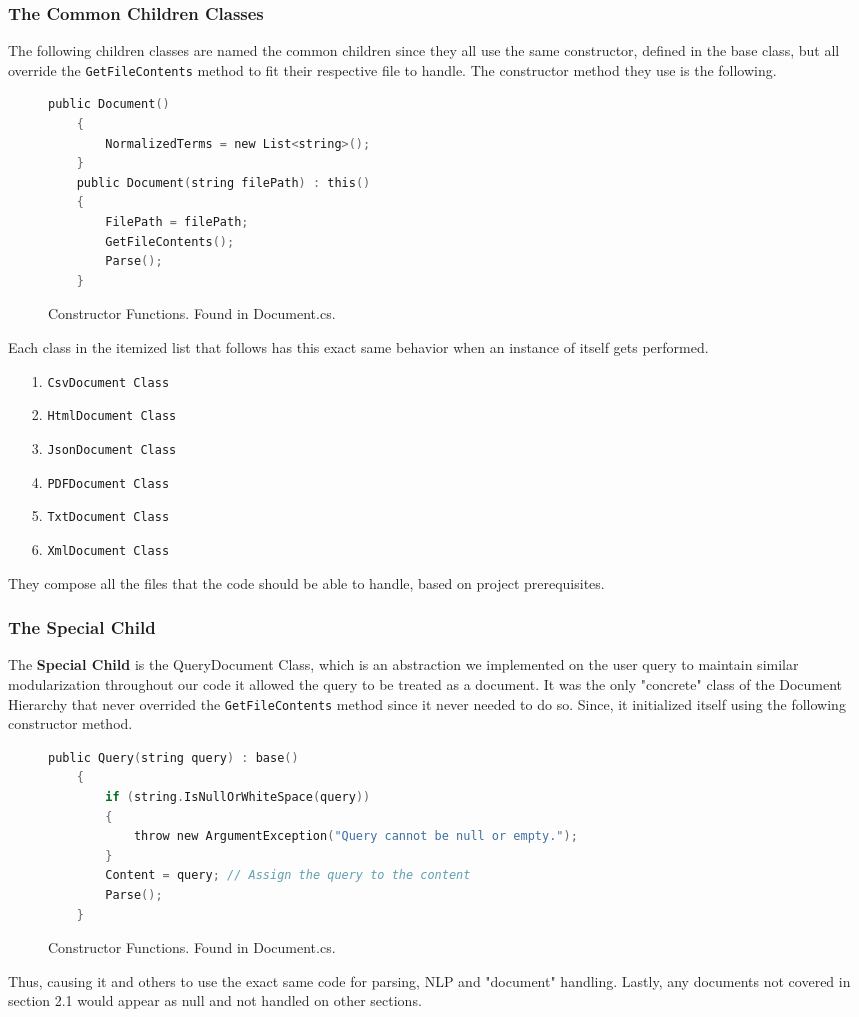 \documentclass{article}
\begin{document}
\subsubsection{The Common Children Classes}
The following children classes are named the common children since they all use the same constructor, defined in the base class, but all override the \texttt{GetFileContents} method to fit their respective file to handle. The constructor method they use is the following.
\begin{figure}[H]
    \begin{lstlisting}[language=C]
    public Document() 
    {
        NormalizedTerms = new List<string>();
    }
    public Document(string filePath) : this()
    {   
        FilePath = filePath;
        GetFileContents();
        Parse();
    }
    \end{lstlisting}
    \caption{Constructor Functions. Found in Document.cs.}
    \label{fig:Constructor}
\end{figure}
Each class in the itemized list that follows has this exact same behavior when an instance of itself gets performed. 
\begin{itemize}
    \item[1.] \texttt{CsvDocument Class} 
    \item[2.] \texttt{HtmlDocument Class}
    \item[3.] \texttt{JsonDocument Class}
    \item[4.] \texttt{PDFDocument Class}
    \item[5.] \texttt{TxtDocument Class}
    \item[6.] \texttt{XmlDocument Class}
\end{itemize}
They compose all the files that the code should be able to handle, based on project prerequisites.
\subsubsection{The Special Child}
The \textbf{Special Child} is the QueryDocument Class, which is an abstraction we implemented on the user query to maintain similar modularization throughout 
our code it allowed the query to be treated as a document. It was the only "concrete" class of the Document Hierarchy that never overrided the \texttt{GetFileContents}
method since it never needed to do so. Since, it initialized itself using the following constructor method.
\begin{figure}[H]
    \begin{lstlisting}[language=C]
    public Query(string query) : base()
    {
        if (string.IsNullOrWhiteSpace(query))
        {
            throw new ArgumentException("Query cannot be null or empty.");
        }   
        Content = query; // Assign the query to the content
        Parse();
    }
    \end{lstlisting}
    \caption{Constructor Functions. Found in Document.cs.}
    \label{fig:Constructor2}
\end{figure}
Thus, causing  it and others to use the exact same code for parsing, 
NLP and "document" handling. Lastly, any documents not covered in section 2.1
would appear as null and not handled on other sections.
\end{document}
